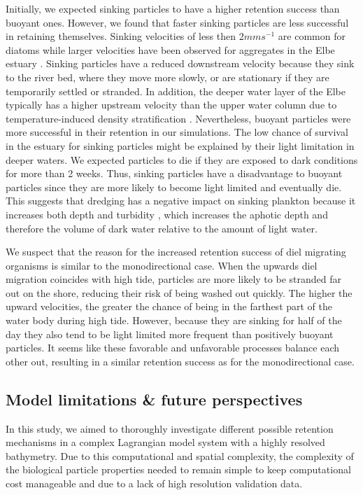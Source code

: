 \documentclass[npg, manuscript]{copernicus}
\begin{document}
Initially, we expected sinking particles to have a higher retention success than buoyant ones. 
However, we found that faster sinking particles are less successful in retaining themselves.
Sinking velocities of less then $2 \unit{mm s^{-1}}$ are common for diatoms \citep{Passow1991} while larger velocities have been observed for aggregates in the Elbe estuary \citep{Fennessy1996}.
Sinking particles have a reduced downstream velocity because they sink to the river bed, where they move more slowly, or are stationary if they are temporarily settled or stranded.
In addition, the deeper water layer of the Elbe typically has a higher upstream velocity than the upper water column due to temperature-induced density stratification \citep{Pein2021}.
Nevertheless, buoyant particles were more successful in their retention in our simulations.
The low chance of survival in the estuary for sinking particles might be explained by their light limitation in deeper waters.
We expected particles to die if they are exposed to dark conditions for more than 2 weeks.
Thus, sinking particles have a disadvantage to buoyant particles since they are more likely to become light limited and eventually die.
This suggests that dredging has a negative impact on sinking plankton because it increases both depth and turbidity \citep{DeJonge2014}, which increases the aphotic depth and therefore the volume of dark water relative to the amount of light water.

We suspect that the reason for the increased retention success of diel migrating organisms is similar to the monodirectional case.
When the upwards diel migration coincides with high tide, particles are more likely to be stranded far out on the shore, reducing their risk of being washed out quickly.
The higher the upward velocities, the greater the chance of being in the farthest part of the water body during high tide.
However, because they are sinking for half of the day they also tend to be light limited more frequent than positively buoyant particles.
It seems like these favorable and unfavorable processes balance each other out, resulting in a similar retention success as for the monodirectional case.


\subsection{Model limitations \& future perspectives}

In this study, we aimed to thoroughly investigate different possible retention mechanisms in a complex Lagrangian model system with a highly resolved bathymetry.  
Due to this computational and spatial complexity, the complexity of the biological particle properties needed to remain simple to keep computational cost manageable and due to a lack of high resolution validation data.
\end{document}
